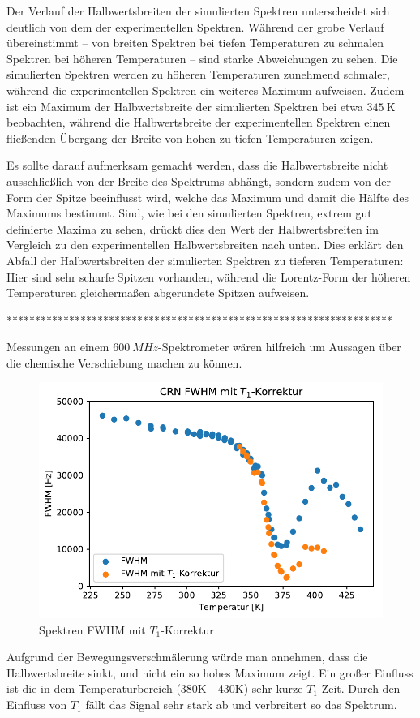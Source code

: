 Der Verlauf der Halbwertsbreiten der simulierten Spektren unterscheidet sich deutlich von dem der experimentellen Spektren. Während der grobe Verlauf übereinstimmt -- von breiten Spektren bei tiefen Temperaturen zu schmalen Spektren bei höheren Temperaturen -- sind starke Abweichungen zu sehen. Die simulierten Spektren werden zu höheren Temperaturen zunehmend schmaler, während die experimentellen Spektren ein weiteres Maximum aufweisen. Zudem ist ein Maximum der Halbwertsbreite der simulierten Spektren bei etwa $\SI{345}{\kelvin}$ beobachten, während die Halbwertsbreite der experimentellen Spektren einen fließenden Übergang der Breite von hohen zu tiefen Temperaturen zeigen.

Es sollte darauf aufmerksam gemacht werden, dass die Halbwertsbreite nicht ausschließlich von der Breite des Spektrums abhängt, sondern zudem von der Form der Spitze beeinflusst wird, welche das Maximum und damit die Hälfte des Maximums bestimmt. Sind, wie bei den simulierten Spektren, extrem gut definierte Maxima zu sehen, drückt dies den Wert der Halbwertsbreiten im Vergleich zu den experimentellen Halbwertsbreiten nach unten. Dies erklärt den Abfall der Halbwertsbreiten der simulierten Spektren zu tieferen Temperaturen: Hier sind sehr scharfe Spitzen vorhanden, während die Lorentz-Form der höheren Temperaturen gleichermaßen abgerundete Spitzen aufweisen.



********************************************************************


 Messungen an einem $\SI{600}{MHz}$-Spektrometer wären hilfreich um Aussagen über die chemische Verschiebung machen zu können.


\begin{figure}
	\begin{center}
		\includegraphics[width=\textwidth]{graphics/plots/SPEK/spek_t1korr.pdf}
	\end{center}
	\caption{Spektren FWHM mit $T_1$-Korrektur} \label{fig:res:spek_fwhm_t1}
\end{figure}
Aufgrund der Bewegungsverschmälerung würde man annehmen, dass die Halbwertsbreite sinkt, und nicht ein so hohes Maximum zeigt. Ein großer Einfluss ist die in dem Temperaturbereich (380K - 430K) sehr kurze $T_1$-Zeit. Durch den Einfluss von $T_1$ fällt das Signal sehr stark ab und verbreitert so das Spektrum.

